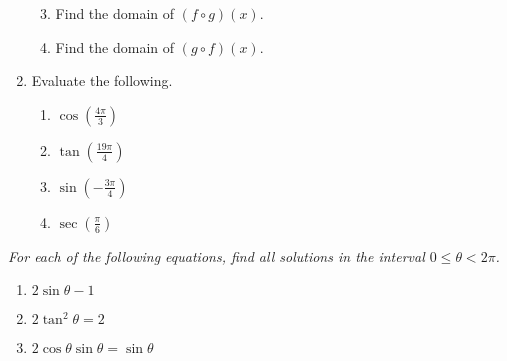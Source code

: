 \documentclass[11pt]{article}
\begin{document}
\begin{enumerate}
\begin{multicols}{2}
\begin{enumerate}
\setcounter{enumii}{2}
\item Find the domain of $(f \circ g)(x)$.
\item Find the domain of $(g \circ f)(x)$.
\end{enumerate}
\end{multicols}
\vfill

\item Evaluate the following.
\begin{multicols}{4}
\begin{enumerate}
\item $\cos\left( \frac{4\pi}{3} \right)$
\item $\tan\left( \frac{19\pi}{4} \right)$
\item $\sin\left( -\frac{3\pi}{4} \right)$
\item $\sec\left( \frac{\pi}{6} \right)$
\end{enumerate}
\end{multicols}
\setcounter{enumCount}{\theenumi}
\end{enumerate}
\vfill

\noindent
\textit{For each of the following equations, find all solutions in the interval $0 \le \theta < 2\pi$. }
\begin{multicols}{3}
\begin{enumerate}
\setcounter{enumi}{\theenumCount}
\item $2 \sin \theta - 1$
\item $2 \tan^2 \theta = 2$
\item $2 \cos \theta \sin \theta = \sin \theta$
\setcounter{enumCount}{\theenumi}
\end{enumerate}
\end{multicols}
\vfill
\end{document}
